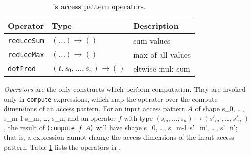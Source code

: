 \begin{table}
    \centering
    \caption{\g's access pattern operators.}
    \label{tab:operators}
    \begin{tabularx}{\linewidth}{lXX}
    Operator & Type & Description\\
    \hline
    \texttt{reduceSum} & $(\dots) \rightarrow ()$ &
    sum values
    \\
    
    \texttt{reduceMax} & $(\dots) \rightarrow ()$&
    max of all values\\
    
    \texttt{dotProd} &
    $(t,s_0, \dots, s_n)\rightarrow ()$ &
    eltwise mul; sum
    \\
    

   
    \end{tabularx}
\end{table}

\textit{Operators}
  are the only \g
  constructs
  which
  perform computation.
They are invoked only
  in \texttt{compute} expressions,
  which map the operator
  over the compute dimensions
  of an access pattern.
For an input access pattern
  $A$
  of shape
  \accesspatternshape
  {s_0, \dots, s_{m-1}}
  {s_m, \dots, s_{n}},
  and an operator
  $f$
  with type
  $(s_m,\dots,s_n)
  \rightarrow
  (s'_{m'}, \dots, s'_{n'})$,
  the result of
  \texttt{(compute $f$ $A$)}
  will have shape
  \accesspatternshape
  {s_0, \dots, s_{m-1}}
  {s'_{m'}, \dots, s'_{n'}};
  that is, a 
  expression
  cannot change
  the access dimensions
  of the input access pattern.
Table \ref{tab:operators}
  lists
  the operators
  in \g{}.
  
